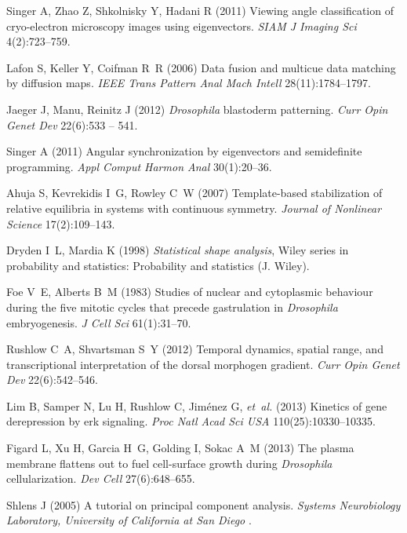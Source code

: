 \documentclass{pnastwo}
\begin{document}
\begin{article}
\begin{thebibliography}{10}
Singer A, Zhao Z, Shkolnisky Y, Hadani R (2011) Viewing angle
classification of cryo-electron microscopy images using eigenvectors. \textit{SIAM J Imaging Sci} 4(2):723--759.

Lafon S, Keller Y, Coifman R~R (2006) 
Data fusion and multicue data matching by diffusion maps. \textit{IEEE Trans Pattern Anal Mach Intell}
28(11):1784--1797.

Jaeger J, Manu, Reinitz J (2012) \textit{{D}rosophila} blastoderm patterning.
  \textit{Curr Opin Genet Dev} 22(6):533 -- 541.

Singer A (2011) Angular synchronization by eigenvectors and semidefinite
  programming. \textit{Appl Comput Harmon Anal}
  30(1):20--36.

Ahuja S, Kevrekidis I~G, Rowley C~W (2007) Template-based stabilization of
  relative equilibria in systems with continuous symmetry. \textit{Journal of
  Nonlinear Science} 17(2):109--143.

Dryden I~L, Mardia K (1998) \textit{Statistical shape analysis}, Wiley series
  in probability and statistics: Probability and statistics (J. Wiley).

Foe V~E, Alberts B~M (1983) Studies of nuclear and cytoplasmic behaviour during
  the five mitotic cycles that precede gastrulation in \textit{{D}rosophila}
  embryogenesis. \textit{J Cell Sci} 61(1):31--70.

Rushlow C~A, Shvartsman S~Y (2012) Temporal dynamics, spatial range, and
  transcriptional interpretation of the dorsal morphogen gradient.
  \textit{Curr Opin Genet Dev} 22(6):542--546.

Lim B, Samper N, Lu H, Rushlow C, Jim{\'e}nez G, \textit{et~al.} (2013)
  Kinetics of gene derepression by erk signaling. \textit{Proc Natl Acad Sci USA} 110(25):10330--10335.

Figard L, Xu H, Garcia H~G, Golding I, Sokac A~M (2013) The plasma membrane
  flattens out to fuel cell-surface growth during \textit{{D}rosophila}
  cellularization. \textit{Dev Cell} 27(6):648--655.

Shlens J (2005) A tutorial on principal component analysis. \textit{Systems
  Neurobiology Laboratory, University of California at San Diego} .


\end{thebibliography}
\end{article}
\end{document}

